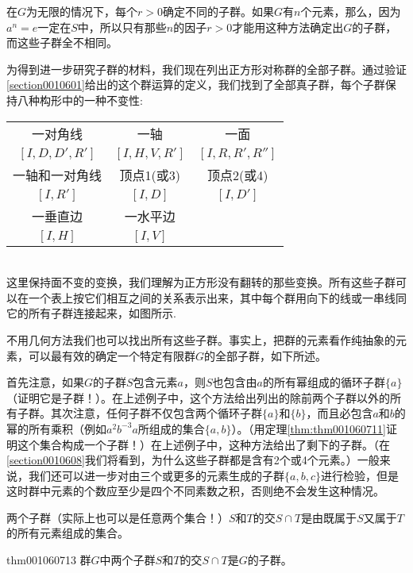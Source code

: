 在$G$为无限的情况下，每个$r>0$确定不同的子群。如果$G$有$n$个元素，那么，因为$a^n=e$一定在$S$中，所以只有那些$n$的因子$r>0$才能用这种方法确定出$G$的子群，而这些子群全不相同。

为得到进一步研究子群的材料，我们现在列出正方形对称群的全部子群。通过验证\ref{section0010601}给出的这个群运算的定义，我们找到了全部真子群，每个子群保持八种构形中的一种不变性:
\begin{table}[htbp]\renewcommand\arraystretch{1.5}\addtolength{\tabcolsep}{10pt}
\begin{center}
\begin{tabular}{ccc}
一对角线 & 一轴 &  一面\\
$[I,D,D',R']$ & $[I, H, V, R']$ & $[I, R, R', R'']$\\
一轴和一对角线 & 顶点1(或3) & 顶点2(或4) \\
$[I, R']$ & $[I, D]$ & $[I, D']$\\
一垂直边 & 一水平边 & \\
$[I, H]$ & $[I, V]$ & 
\end{tabular}
\end{center}
\end{table}
\\这里保持面不变的变换，我们理解为正方形没有翻转的那些变换。所有这些子群可以在一个表上按它们相互之间的关系表示出来，其中每个群用向下的线或一串线同它的所有子群连接起来，如图所示.

不用几何方法我们也可以找出所有这些子群。事实上，把群的元素看作纯抽象的元素，可以最有效的确定一个特定有限群$G$的全部子群，如下所述。

首先注意，如果$G$的子群$S$包含元素$a$，则$S$也包含由$a$的所有幂组成的循环子群$\{a\}$（证明它是子群！）。在上述例子中，这个方法给出列出的除前两个子群以外的所有子群。其次注意，任何子群不仅包含两个循环子群$\{a\}$和$\{b\}$，而且必包含$a$和$b$的幂的所有乘积（例如$a^2b^{-3}a$所组成的集合$\{a,b\}$）。（用定理\ref{thm:thm001060711}证明这个集合构成一个子群！）在上述例子中，这种方法给出了剩下的子群。（在\ref{section0010608}我们将看到，为什么这些子群都是含有2个或4个元素。）一般来说，我们还可以进一步对由三个或更多的元素生成的子群$\{a,b,c\}$进行检验，但是这时群中元素的个数应至少是四个不同素数之积，否则绝不会发生这种情况。

两个子群（实际上也可以是任意两个集合！）$S$和$T$的交$S \cap T$是由既属于$S$又属于$T$的所有元素组成的集合。

\begin{theorem}{}{thm001060713}
群$G$中两个子群$S$和$T$的交$S \cap T$是$G$的子群。
\end{theorem}

